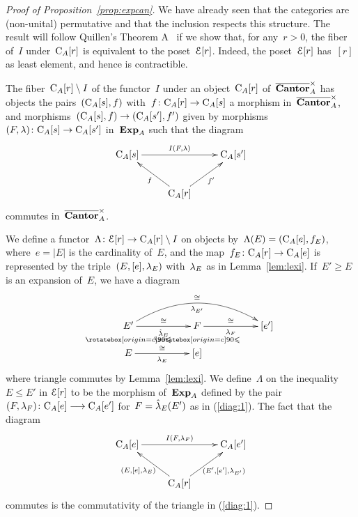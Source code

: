 \begin{proof}[Proof of Proposition~\ref{prop:expcan}]
We have already seen that the categories are (non-unital) permutative and that the inclusion respects this structure. 
The result will follow Quillen's Theorem A~\cite[\S1]{Quillen} if we show that, for any~$r>0$,  the fiber of~$I$ under~$\mathrm{C}_A[r]$ is equivalent to the poset~$\mathcal{E}[r]$. Indeed, the poset~$\mathcal{E}[r]$ has~$[r]$ as least element, and hence is contractible. 



The fiber~$\mathrm{C}_A[r]\setminus I$ of the functor~$I$ under an object~$\mathrm{C}_A[r]$ of~$\overline{\mathbf{Cantor}}_A^\times$  has objects the pairs~$(\mathrm{C}_A[s],f)$ with~$f\colon\mathrm{C}_A[r]\to\mathrm{C}_A[s]$ a morphism in~$\overline{\mathbf{Cantor}}_A^\times$, and morphisms~$(\mathrm{C}_A[s],f)\to (\mathrm{C}_A[s'],f')$ given by morphisms~$(F,\lambda)\colon \mathrm{C}_A[s]\to \mathrm{C}_A[s']$ in~$\mathbf{Exp}_A$ such that
the diagram 
$$\xymatrix{\rmC_A[s]\ar[rr]^-{I(F,\lambda)} &&\rmC_A[s'] \\
& \ar[ul]^{f} \rmC_A[r] \ar[ur]_{f'} & }$$ 
commutes in~$\overline{\mathbf{Cantor}}_A^\times$. 
 
We define a functor~$\Lambda\colon\mathcal{E}[r]\to \mathrm{C}_A[r]\setminus I$ on objects by~\hbox{$\Lambda(E)=(\mathrm{C}_A[e],f_E)$}, where~$e=|E|$ is the cardinality of~$E$, and the map~\hbox{$f_E\colon\mathrm{C}_A[r]\to \mathrm{C}_A[e]$} is represented by the triple~$(E,[e],\lambda_E)$ 
with~$\lambda_E$ as in Lemma~\ref{lem:lexi}. 
If~$E'\ge E$ is an expansion of~$E$, we have a diagram
\begin{equation}\label{diag:1}
\xymatrix@R-1pc{E'\ar@{}[d]|{\IV} \ar[rr]^-\cong_-{\hat \la_E} \ar@/^2pc/[rrrr]^-\cong_-{\la_{E'}} && F \ar@{}[d]|{\IV} \ar[rr]^-\cong_-{\la_F} && [e']\\
 E \ar[rr]^-\cong_-{\la_E} &&  [e]& & %
}\end{equation}
where triangle commutes by Lemma~\ref{lem:lexi}. We  define~$\Lambda$ on the inequality~\hbox{$E\leqslant E'$} in $\mathcal{E}[r]$ to be the morphism of~$\mathbf{Exp}_A$ defined by the pair~\hbox{$(F,\lambda_F)\colon\mathrm{C}_A[e]\longrightarrow \mathrm{C}_A[e']$} for~$F=\hat{\lambda}_E(E')$ as in (\ref{diag:1}). %
The fact that the diagram 
$$\xymatrix{\rmC_A[e]\ar[rr]^-{I(F,\la_F)} &&\rmC_A[e'] \\
& \ar[ul]^{(E,[e],\la_E)} \rmC_A[r] \ar[ur]_{(E',[e'],\la_{E'})}& }$$ 
commutes is the commutativity of the triangle in (\ref{diag:1}). 


\end{proof}
